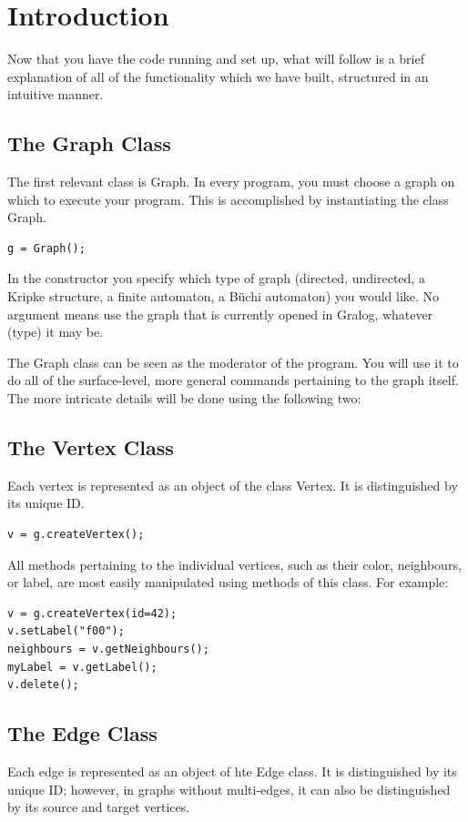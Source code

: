 \documentclass{article}
\newcounter{example}
\newlength\q
\begin{document}
\section{Introduction}
Now that you have the code running and set up, what will follow is a brief explanation of all of the functionality which we have built, structured in an intuitive manner.

\subsection{The Graph Class}
The first relevant class is Graph. In every program, you must choose a graph on which to execute your program. This is accomplished by instantiating the class Graph. 

\begin{lstlisting}
g = Graph();
\end{lstlisting}

In the constructor you specify which type of graph (directed,
undirected, a Kripke structure, a finite automaton, a Büchi automaton) you would like. No
argument means use the graph that is currently opened in Gralog, whatever (type) it may be.

The Graph class can be seen as the moderator of the program. You will use it to do all of the surface-level, more general commands pertaining to the graph itself. The more intricate details will be done using the following two:

\subsection{The Vertex Class}
Each vertex is represented as an object of the class Vertex. It is distinguished by its unique ID. 

\begin{lstlisting}
v = g.createVertex();
\end{lstlisting}

All methods pertaining to the individual vertices, such as their color, neighbours, or label, are most easily manipulated using methods of this class. For example:

\begin{lstlisting}
v = g.createVertex(id=42);
v.setLabel("f00");
neighbours = v.getNeighbours();
myLabel = v.getLabel();
v.delete();
\end{lstlisting}

\subsection{The Edge Class}
Each edge is represented as an object of hte Edge class. It is distinguished by its unique ID; however, in graphs without multi-edges, it can also be distinguished by its source and target vertices.
\end{document}
